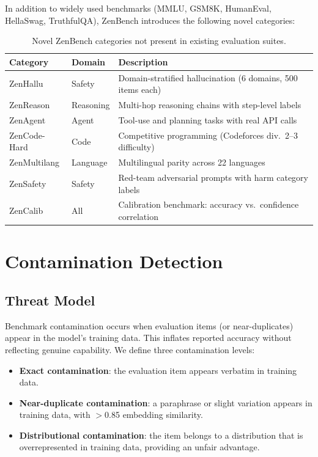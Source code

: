 \documentclass[11pt,a4paper]{article}
\begin{document}
In addition to widely used benchmarks (MMLU, GSM8K, HumanEval, HellaSwag, TruthfulQA),
ZenBench introduces the following novel categories:

\begin{table}[H]
\centering
\caption{Novel ZenBench categories not present in existing evaluation suites.}
\begin{tabular}{lll}
\toprule
\textbf{Category} & \textbf{Domain} & \textbf{Description} \\
\midrule
ZenHallu     & Safety    & Domain-stratified hallucination (6 domains, 500 items each) \\
ZenReason    & Reasoning & Multi-hop reasoning chains with step-level labels \\
ZenAgent     & Agent     & Tool-use and planning tasks with real API calls \\
ZenCode-Hard & Code      & Competitive programming (Codeforces div.\ 2--3 difficulty) \\
ZenMultilang & Language  & Multilingual parity across 22 languages \\
ZenSafety    & Safety    & Red-team adversarial prompts with harm category labels \\
ZenCalib     & All       & Calibration benchmark: accuracy vs.\ confidence correlation \\
\bottomrule
\end{tabular}
\label{tab:novel}
\end{table}

\section{Contamination Detection}
\label{sec:contamination}

\subsection{Threat Model}

Benchmark contamination occurs when evaluation items (or near-duplicates) appear in
the model's training data. This inflates reported accuracy without reflecting genuine
capability. We define three contamination levels:

\begin{itemize}
    \item \textbf{Exact contamination}: the evaluation item appears verbatim in training data.
    \item \textbf{Near-duplicate contamination}: a paraphrase or slight variation appears
          in training data, with $>$0.85 embedding similarity.
    \item \textbf{Distributional contamination}: the item belongs to a distribution that
          is overrepresented in training data, providing an unfair advantage.
\end{itemize}
\end{document}

